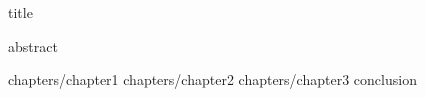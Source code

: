\documentclass[12pt]{book}
\begin{document}
\frontmatter



{title}

{abstract}
\tableofcontents

\restoregeometry

\mainmatter

{chapters/chapter1}
{chapters/chapter2}
{chapters/chapter3}
{conclusion}

\backmatter
\end{document}
